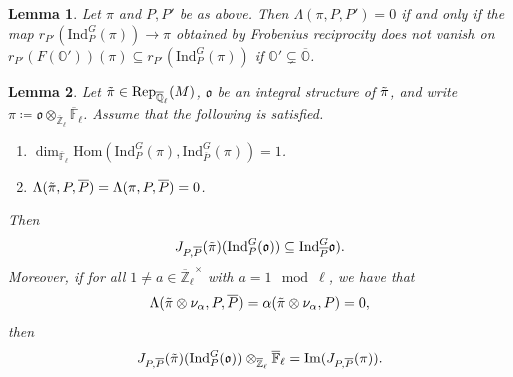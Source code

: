 \documentclass[10pt,a4paper]{amsart}
\newtheorem{lemma}{Lemma}
\newcommand{\bl}{\otimes_\zl\fl}
\newcommand{\df}{\dim_\fl}
\newcommand{\fl}{{\overline{\mathbb{F}}_\ell}}
\newcommand{\fo}{\mathfrak{o}}
\newcommand{\ho}{\mathrm{Hom}}
\newcommand{\id}{\mathrm{Ind}}
\newcommand{\im}{\mathrm{Im}}
\newcommand{\ip}{\mathrm{Ind}_P^G}
\newcommand{\oo}{\mathbb{O}}
\newcommand{\op}{\overline{P}}
\newcommand{\ql}{{\overline{\mathbb{Q}}_\ell}}
\newcommand{\ra}{\rightarrow}
\newcommand{\rep}{\mathrm{Rep}}
\newcommand{\tpi}{\Tilde{\pi}}
\newcommand{\zl}{{\overline{\mathbb{Z}}_\ell}}
\begin{document}
\begin{lemma}\label{L:noresidue}
    Let $\pi$ and $P,P'$ be as above. Then $\Lambda(\pi,P,P')=0$ if and only if the map
    $r_{P'}(\ip(\pi))\ra \pi$ obtained by Frobenius reciprocity does not vanish on $r_{P'}(F(\oo'))(\pi)\subseteq r_{P'}(\ip(\pi))$ if $\oo'\subsetneq\overline{\oo}$. 
\end{lemma}

\begin{lemma}\label{L:ratJ}
    Let $\tpi\in\rep_\ql(M)$, $\fo$ be an integral structure of $\tpi$, and write $\pi\coloneqq\fo\bl$. Assume that the following is satisfied.
    \begin{enumerate}
        \item $\df\ho(\ip(\pi),\id_{\op}^G(\pi))=1$.
        \item $\Lambda(\tpi,P,\op)=\Lambda(\pi,P,\op)=0$.
    \end{enumerate}
    Then \[J_{P,\overline{P}}(\tpi)(\ip(\fo))\subseteq \id_{\op}^G\fo).\]
    Moreover, if for all $1\neq a\in\zl^\times$ with $a=1\mod\ell$, we have that \[\Lambda(\tpi\otimes\nu_\alpha,P,\op)=\alpha(\tpi\otimes\nu_\alpha,P)=0,\] then \[J_{P,\overline{P}}(\tpi)(\ip(\fo))\bl=\im(J_{P,\op}(\pi)).\]
\end{lemma}
\end{document}
